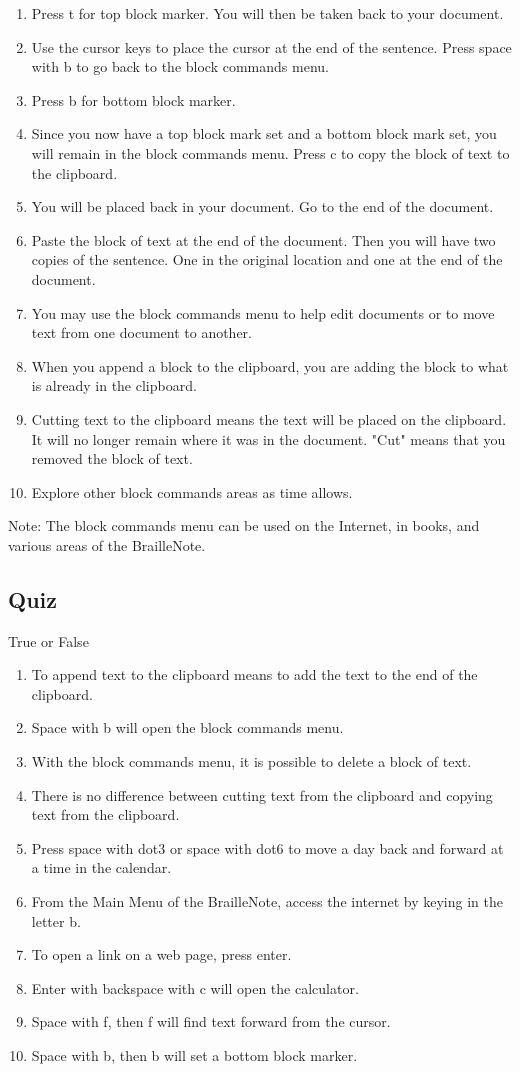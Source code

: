 \documentclass[10pt,letterpaper,twoside]{report}
\begin{document}
{{{\begin{enumerate}
	\item Press t for top block marker.  You will then be taken back to your document.
	\item Use the cursor keys to place the cursor at the end of the sentence.  Press space with b to go back to the block commands menu.
	\item Press b for bottom block marker.
	\item Since you now have a top block mark set and a bottom block mark set, you will remain in the block commands menu.  Press c to copy the block of text to the clipboard.
	\item You will be placed back in your document.  Go to the end of the document.
	\item Paste the block of text at the end of the document.  Then you will have two copies of the sentence.  One in the original location and one at the end of the document.
	\item You may use the block commands menu to help edit documents or to move text from one document to another.
	\item When you append a block to the clipboard, you are adding the block to what is already in the clipboard.
	\item Cutting text to the clipboard means the text will be placed on the clipboard.  It will no longer remain where it was in the document.  "Cut" means that you removed the block of text.
	\item Explore other block commands areas as time allows.
\end{enumerate}

Note: The block commands menu can be used on the Internet, in books, and various areas of the BrailleNote.
\clearpage
\subsection{Quiz}
True or False
\begin{enumerate}
	\item To append text to the clipboard means to add the text to the end of the clipboard.
	\item Space with b will open the block commands menu.
	\item With the block commands menu, it is possible to delete a block of text.
	\item There is no difference between cutting text from the clipboard and copying text from the clipboard.
	\item Press space with dot3 or space with dot6 to move a day back and forward at a time in the calendar.
	\item From the Main Menu of the BrailleNote, access the internet by keying in the letter b.
	\item To open a link on a web page, press enter.
	\item Enter with backspace with c will open the calculator.
	\item Space with f, then f will find text forward from the cursor.
	\item Space with b, then b will set a bottom block marker.
\end{enumerate}

}}}
\end{document}
